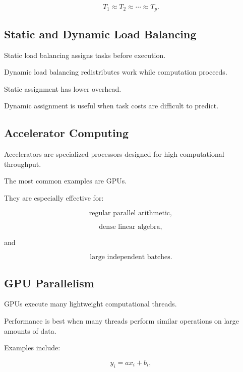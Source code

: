 \[
\boxed{
T_1
\approx
T_2
\approx
\cdots
\approx
T_p.
}
\]

\subsection{Static and Dynamic Load Balancing}
\label{subsec:static-dynamic-load-balancing}

Static load balancing assigns tasks before execution.

Dynamic load balancing redistributes work while computation proceeds.

Static assignment has lower overhead.

Dynamic assignment is useful when task costs are difficult to predict.

\subsection{Accelerator Computing}
\label{subsec:accelerator-computing}

Accelerators are specialized processors designed for high computational
throughput.

The most common examples are GPUs.

They are especially effective for:

\[
\boxed{
\text{regular parallel arithmetic},
}
\]

\[
\boxed{
\text{dense linear algebra},
}
\]

and

\[
\boxed{
\text{large independent batches}.
}
\]

\subsection{GPU Parallelism}
\label{subsec:gpu-parallelism}

GPUs execute many lightweight computational threads.

Performance is best when many threads perform similar operations on large
amounts of data.

Examples include:

\[
\boxed{
y_i=ax_i+b_i,
}
\]

